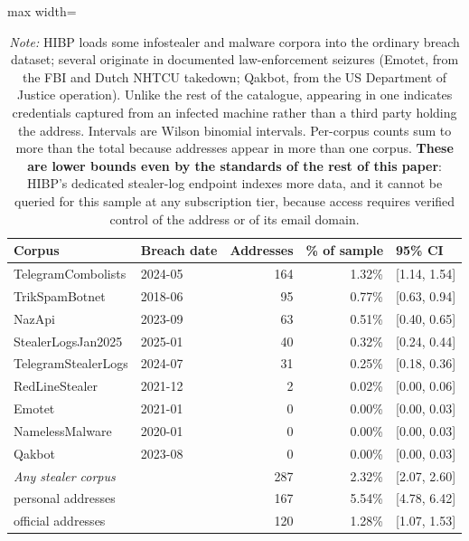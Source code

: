 \begin{table}[!htbp]
\centering
\footnotesize
\def\sym#1{\ifmmode^{#1}\else\(^{#1}\)\fi}
\caption{Politician addresses appearing in stealer-log corpora}
\label{tab:stealer_logs}
\begin{adjustbox}{max width=\linewidth}
\begin{tabular}{llrrl}
\toprule\toprule
Corpus & Breach date & Addresses & \% of sample & 95\% CI \\
\midrule
TelegramCombolists & 2024-05 & 164 & 1.32\% & [1.14, 1.54] \\
TrikSpamBotnet & 2018-06 &  95 & 0.77\% & [0.63, 0.94] \\
NazApi & 2023-09 &  63 & 0.51\% & [0.40, 0.65] \\
StealerLogsJan2025 & 2025-01 &  40 & 0.32\% & [0.24, 0.44] \\
TelegramStealerLogs & 2024-07 &  31 & 0.25\% & [0.18, 0.36] \\
RedLineStealer & 2021-12 &   2 & 0.02\% & [0.00, 0.06] \\
Emotet & 2021-01 &   0 & 0.00\% & [0.00, 0.03] \\
NamelessMalware & 2020-01 &   0 & 0.00\% & [0.00, 0.03] \\
Qakbot & 2023-08 &   0 & 0.00\% & [0.00, 0.03] \\
\textit{Any stealer corpus} &  & 287 & 2.32\% & [2.07, 2.60] \\
\quad personal addresses &  & 167 & 5.54\% & [4.78, 6.42] \\
\quad official addresses &  & 120 & 1.28\% & [1.07, 1.53] \\
\bottomrule
\end{tabular}
\end{adjustbox}
\caption*{\scriptsize \emph{Note:} HIBP loads some infostealer and malware corpora into the ordinary breach dataset; several originate in documented law-enforcement seizures (Emotet, from the FBI and Dutch NHTCU takedown; Qakbot, from the US Department of Justice operation). Unlike the rest of the catalogue, appearing in one indicates credentials captured from an infected machine rather than a third party holding the address. Intervals are Wilson binomial intervals. Per-corpus counts sum to more than the total because addresses appear in more than one corpus. \textbf{These are lower bounds even by the standards of the rest of this paper}: HIBP's dedicated stealer-log endpoint indexes more data, and it cannot be queried for this sample at any subscription tier, because access requires verified control of the address or of its email domain.}
\end{table}
